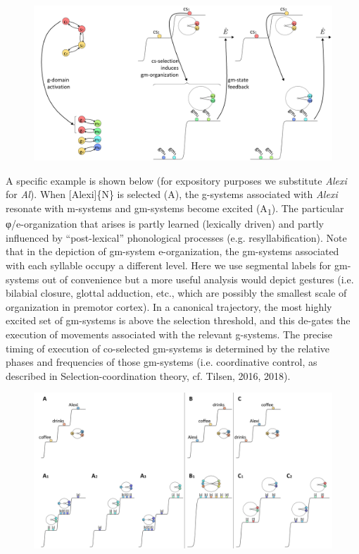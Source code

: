   
\begin{figure}
\includegraphics[width=\textwidth]{figures/Tilsen-img54.png}
\caption{\missingcaption}
\label{fig:}
\end{figure}
 

  A specific example is shown below (for expository purposes we substitute \textit{Alexi} for \textit{Al}). When [Alexi]\{N\} is selected (A), the g-systems associated with \textit{Alexi} resonate with m-systems and gm-systems become excited (A\textsubscript{1}). The particular φ/e-organization that arises is partly learned (lexically driven) and partly influenced by “post-lexical” phonological processes (e.g. resyllabification). Note that in the depiction of gm-system e-organization, the gm-systems associated with each syllable occupy a different level. Here we use segmental labels for gm-systems out of convenience but a more useful analysis would depict gestures (i.e. bilabial closure, glottal adduction, etc., which are possibly the smallest scale of organization in premotor cortex). In a canonical trajectory, the most highly excited set of gm-systems is above the selection threshold, and this de-gates the execution of movements associated with the relevant g-systems. The precise timing of execution of co-selected gm-systems is determined by the relative phases and frequencies of those gm-systems (i.e. coordinative control, as described in Selection-coordination theory, cf. Tilsen, 2016, 2018). 

  
\begin{figure}
\includegraphics[width=\textwidth]{figures/Tilsen-img55.png}
\caption{\missingcaption}
\label{fig:}
\end{figure}
 

